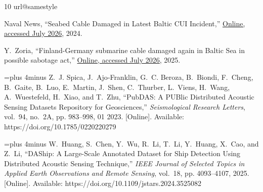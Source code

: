 \documentclass[11pt]{article}
\begin{document}
\begin{thebibliography}{10}
\providecommand{\url}[1]{#1}
\csname url@samestyle\endcsname
\providecommand{\newblock}{\relax}
\providecommand{\bibinfo}[2]{#2}
\providecommand{\BIBentrySTDinterwordspacing}{\spaceskip=0pt\relax}
\providecommand{\BIBentryALTinterwordstretchfactor}{4}
\providecommand{\BIBentryALTinterwordspacing}{\spaceskip=\fontdimen2\font plus
\BIBentryALTinterwordstretchfactor\fontdimen3\font minus
  \fontdimen4\font\relax}
\providecommand{\BIBforeignlanguage}[2]{{%
\expandafter\ifx\csname l@#1\endcsname\relax
\typeout{** WARNING: IEEEtran.bst: No hyphenation pattern has been}%
\typeout{** loaded for the language `#1'. Using the pattern for}%
\typeout{** the default language instead.}%
\else
\language=\csname l@#1\endcsname
\fi
#2}}
\providecommand{\BIBdecl}{\relax}
\BIBdecl

{Naval News}, ``{Seabed Cable Damaged in Latest Baltic CUI Incident},''
  \href{https://www.navalnews.com/naval-news/2024/12/seabed-cable-damaged-in-latest-baltic-cui-incident/}{Online,
  accessed July 2026}, 2024.

Y.~Zoria, ``{Finland-Germany submarine cable damaged again in Baltic Sea in
  possible sabotage act},''
  \href{https://euromaidanpress.com/2025/02/21/finland-germany-submarine-cable-damaged-again-in-baltic-sea-in-possible-sabotage-act/}{Online,
  accessed July 2026}, 2025.

\BIBentryALTinterwordspacing
Z.~J. Spica, J.~Ajo‐Franklin, G.~C. Beroza, B.~Biondi, F.~Cheng, B.~Gaite,
  B.~Luo, E.~Martin, J.~Shen, C.~Thurber, L.~Viens, H.~Wang, A.~Wuestefeld,
  H.~Xiao, and T.~Zhu, ``{PubDAS: A PUBlic Distributed Acoustic Sensing
  Datasets Repository for Geosciences},'' \emph{Seismological Research
  Letters}, vol.~94, no.~2A, pp. 983--998, 01 2023. [Online]. Available:
  \url{https://doi.org/10.1785/0220220279}
\BIBentrySTDinterwordspacing

\BIBentryALTinterwordspacing
W.~Huang, S.~Chen, Y.~Wu, R.~Li, T.~Li, Y.~Huang, X.~Cao, and Z.~Li, ``{DAShip:
  A Large-Scale Annotated Dataset for Ship Detection Using Distributed Acoustic
  Sensing Technique},'' \emph{IEEE Journal of Selected Topics in Applied Earth
  Observations and Remote Sensing}, vol.~18, pp. 4093--4107, 2025. [Online].
  Available: \url{https://doi.org/10.1109/jstars.2024.3525082}
\BIBentrySTDinterwordspacing


\end{thebibliography}
\end{document}
